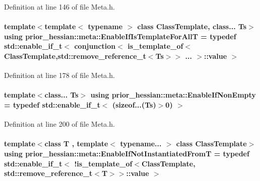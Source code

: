 Definition at line 146 of file Meta.\+h.

\paragraph[{\texorpdfstring{Enable\+If\+Is\+Template\+For\+AllT}{EnableIfIsTemplateForAllT}}]{\setlength{\rightskip}{0pt plus 5cm}template$<$template$<$ typename $>$ class Class\+Template, class... Ts$>$ using {\bf prior\+\_\+hessian\+::meta\+::\+Enable\+If\+Is\+Template\+For\+AllT} = typedef std\+::enable\+\_\+if\+\_\+t$<$ {\bf conjunction}$<$ {\bf is\+\_\+template\+\_\+of}$<$Class\+Template,std\+::remove\+\_\+reference\+\_\+t$<$Ts$>$$>$ ... $>$\+::value $>$}\hypertarget{namespaceprior__hessian_1_1meta_a6c1ba653f64db9c1887e74c50ab257b1}{}\label{namespaceprior__hessian_1_1meta_a6c1ba653f64db9c1887e74c50ab257b1}


Definition at line 178 of file Meta.\+h.

\paragraph[{\texorpdfstring{Enable\+If\+Non\+Empty}{EnableIfNonEmpty}}]{\setlength{\rightskip}{0pt plus 5cm}template$<$class... Ts$>$ using {\bf prior\+\_\+hessian\+::meta\+::\+Enable\+If\+Non\+Empty} = typedef std\+::enable\+\_\+if\+\_\+t$<$ (sizeof...(Ts)$>$0) $>$}\hypertarget{namespaceprior__hessian_1_1meta_a20687a1e7c6127dea649f7719ff455d3}{}\label{namespaceprior__hessian_1_1meta_a20687a1e7c6127dea649f7719ff455d3}


Definition at line 200 of file Meta.\+h.

\paragraph[{\texorpdfstring{Enable\+If\+Not\+Instantiated\+FromT}{EnableIfNotInstantiatedFromT}}]{\setlength{\rightskip}{0pt plus 5cm}template$<$class T , template$<$ typename... $>$ class Class\+Template$>$ using {\bf prior\+\_\+hessian\+::meta\+::\+Enable\+If\+Not\+Instantiated\+FromT} = typedef std\+::enable\+\_\+if\+\_\+t$<$ !{\bf is\+\_\+template\+\_\+of}$<$Class\+Template, std\+::remove\+\_\+reference\+\_\+t$<$T$>$$>$\+::value $>$}\hypertarget{namespaceprior__hessian_1_1meta_a4d2b4afd50ec9adfdf0ad0ba0f690360}{}\label{namespaceprior__hessian_1_1meta_a4d2b4afd50ec9adfdf0ad0ba0f690360}



